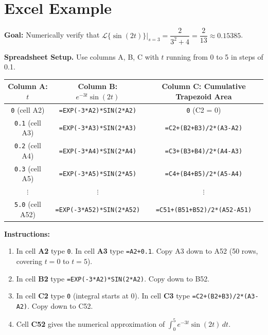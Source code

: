 \documentclass[12pt,a4paper]{article}
\begin{document}
\section{Excel Example }

\textbf{Goal:} Numerically verify that $\mathcal{L}\{\sin(2t)\}\big|_{s=3} = \dfrac{2}{3^2+4} = \dfrac{2}{13} \approx 0.15385$.

\textbf{Spreadsheet Setup.} Use columns A, B, C with $t$ running from 0 to 5 in steps of 0.1.

\begin{center}
\begin{tabular}{@{}ccc@{}}
\toprule
\textbf{Column A: $t$} & \textbf{Column B: $e^{-3t}\sin(2t)$} & \textbf{Column C: Cumulative Trapezoid Area} \\
\midrule
\texttt{0} (cell A2) & \texttt{=EXP(-3*A2)*SIN(2*A2)} & \texttt{0} (C2 = 0) \\
\texttt{0.1} (cell A3) & \texttt{=EXP(-3*A3)*SIN(2*A3)} & \texttt{=C2+(B2+B3)/2*(A3-A2)} \\
\texttt{0.2} (cell A4) & \texttt{=EXP(-3*A4)*SIN(2*A4)} & \texttt{=C3+(B3+B4)/2*(A4-A3)} \\
\texttt{0.3} (cell A5) & \texttt{=EXP(-3*A5)*SIN(2*A5)} & \texttt{=C4+(B4+B5)/2*(A5-A4)} \\
$\vdots$ & $\vdots$ & $\vdots$ \\
\texttt{5.0} (cell A52) & \texttt{=EXP(-3*A52)*SIN(2*A52)} & \texttt{=C51+(B51+B52)/2*(A52-A51)} \\
\bottomrule
\end{tabular}
\end{center}

\textbf{Instructions:}
\begin{enumerate}[leftmargin=*]
  \item In cell \textbf{A2} type \texttt{0}. In cell \textbf{A3} type \texttt{=A2+0.1}.
        Copy A3 down to A52 (50 rows, covering $t = 0$ to $t = 5$).
  \item In cell \textbf{B2} type \texttt{=EXP(-3*A2)*SIN(2*A2)}. Copy down to B52.
  \item In cell \textbf{C2} type \texttt{0} (integral starts at 0).
        In cell \textbf{C3} type \texttt{=C2+(B2+B3)/2*(A3-A2)}. Copy down to C52.
  \item Cell \textbf{C52} gives the numerical approximation of $\int_0^5 e^{-3t}\sin(2t)\,dt$.
\end{enumerate}
\end{document}
